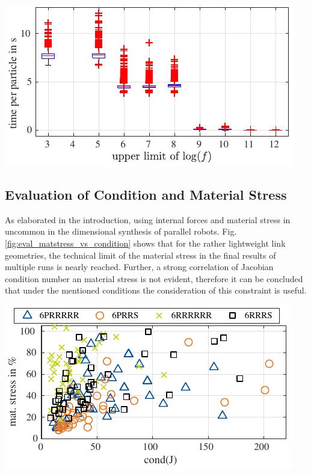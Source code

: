 \documentclass[fleqn,a4paper,10pt]{article}
\renewenvironment{figure}
  {\par\vspace{6pt}\noindent\minipage{\linewidth}}
  {\endminipage\par\vspace{6pt}}
\begin{document}
\begin{multicols}{2}
\begin{figure}
\centering
\includegraphics{./Bilder/figure_calctime_vs_fval.pdf}
\vspace{-0.4cm} %
\label{fig:boxplot_comptime}
\end{figure}

\subsection{Evaluation of Condition and Material Stress}
\label{sec:res_matstress}

As elaborated in the introduction, using internal forces and material stress in uncommon in the dimensional synthesis of parallel robots.
Fig.\,\ref{fig:eval_matstress_vs_condition} shows that for the rather lightweight link geometries, the technical limit of the material stress in the final results of multiple runs is nearly reached.
Further, a strong correlation of Jacobian condition number an material stress is not evident, therefore it can be concluded that under the mentioned conditions the consideration of this constraint is useful.

\begin{figure}
\centering
\includegraphics{./Bilder/figure_matstress_vs_condition.pdf}
\vspace{-0.4cm} %
\label{fig:eval_matstress_vs_condition}
\end{figure}




\end{multicols}
\end{document}
